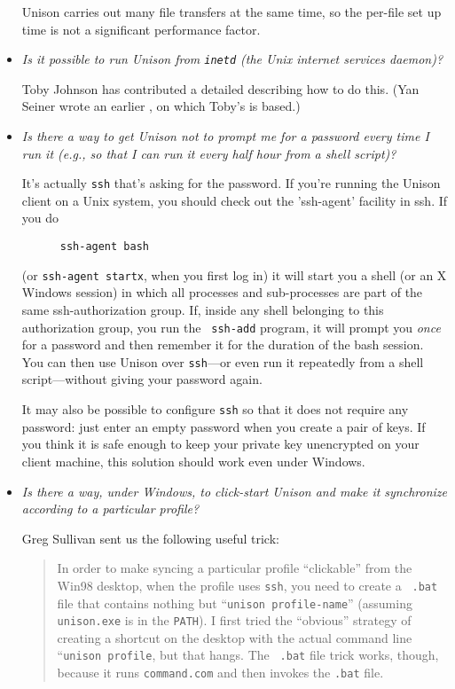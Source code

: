 \begin{itemize}
Unison carries out many file transfers at the same time, so the per-file
set up time is not a significant performance factor.  

\item {\em Is it possible to run Unison from {\tt inetd} (the Unix
  internet services daemon)?}

Toby Johnson has contributed a
detailed
 describing how to do this.  (Yan Seiner wrote an earlier
,
on which Toby's is based.)

\item {\em Is there a way to get Unison not to prompt me for a
    password every time I run it (e.g., so that I can run it every
    half hour from a shell script)?}
  
  It's actually {\tt ssh} that's asking for the password.  If you're
  running the Unison client on a Unix system, you should check out the
  'ssh-agent' facility in ssh.  If you do
\begin{verbatim}
      ssh-agent bash
\end{verbatim}
  (or {\tt ssh-agent startx}, when you first log in) it will start you a
  shell (or an X Windows session) in which all processes and
  sub-processes are part of the same ssh-authorization group.  If, inside
  any shell belonging to this authorization group, you run the {\tt
    ssh-add} program, it will prompt you {\em once} for a password and
  then remember it for the duration of the bash session.  You can then
  use Unison over {\tt ssh}---or even run it repeatedly from a shell
  script---without giving your password again.

  It may also be possible to configure {\tt ssh} so that it does not
  require any password: just enter an empty password when you create a
  pair of keys.  If you think it is safe enough to keep your private key
  unencrypted on your client machine, this solution should work even
  under Windows.

\item {\em Is there a way, under Windows, to click-start Unison and make
  it synchronize according to a particular profile?}

Greg Sullivan sent us the following useful trick: 

\begin{quote}
In order to make syncing a particular profile ``clickable'' from the
Win98 desktop, when the profile uses {\tt ssh}, you need to create a {\tt
  .bat} file that contains nothing but ``{\tt unison profile-name}''
(assuming {\tt unison.exe} is in the {\tt PATH}).  I first tried the
``obvious'' strategy of creating a shortcut on the desktop with the
actual command line ``{\tt unison profile}, but that hangs.  The {\tt
  .bat} file trick works, though, because it runs {\tt command.com} and
then invokes the {\tt .bat} file.
\end{quote}


\end{itemize}
